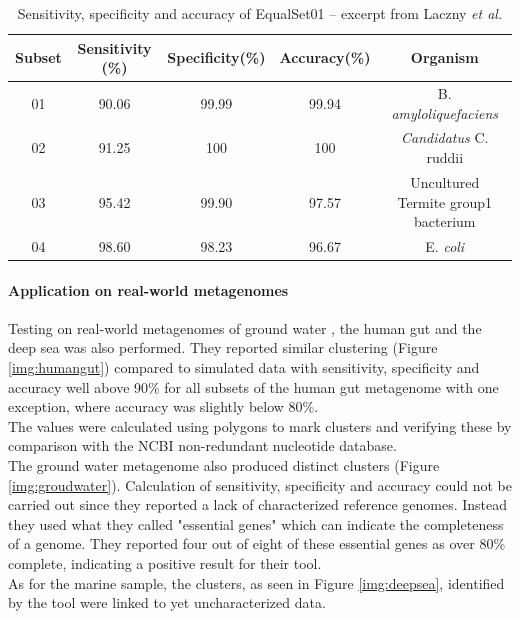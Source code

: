 \documentclass[twocolumn]{bmcart}%
\begin{document}
\begin{table}[h]
	\centering
	\caption{Sensitivity, specificity and accuracy of EqualSet01 -- excerpt from Laczny \textit{et al.}\cite{Laczny2014}}
	\begin{tabular}{c|c|c|c|c}
		Subset&Sensitivity (\%)&Specificity(\%)&Accuracy(\%)&Organism\\
		\hline
		01&90.06&99.99&99.94&B. \textit{amyloliquefaciens}\\
		02&91.25&100&100&\textit{Candidatus} C. ruddii\\
		03&95.42&99.90&97.57&Uncultured Termite group1 bacterium\\
		04&98.60&98.23&96.67&E. \textit{coli}
	\end{tabular}
\label{tab:sens-spec-acc1}
\end{table}%
\paragraph*{Application on real-world metagenomes}
Testing on real-world metagenomes of ground water \cite{Wrighton1661}, the human gut \cite{Arumugam2011} and the deep sea \cite{Konstantinidis15082009} was also performed. They reported similar clustering (Figure \ref{img:humangut}) compared to simulated data with sensitivity, specificity and accuracy well above 90\% for all subsets of the human gut metagenome with one exception, where accuracy was slightly below 80\%.\\
The values were calculated using polygons to mark clusters and verifying these by comparison with the NCBI non-redundant nucleotide database.\\
The ground water metagenome also produced distinct clusters (Figure \ref{img:groudwater}). Calculation of sensitivity, specificity and accuracy could not be carried out since they reported a lack of characterized reference genomes. Instead they used what they called "essential genes" which can indicate the completeness of a genome. They reported four out of eight of these essential genes as over 80\% complete, indicating a positive result for their tool.\\
As for the marine sample, the clusters, as seen in Figure \ref{img:deepsea}, identified by the tool were linked to yet  uncharacterized data.
\end{document}
